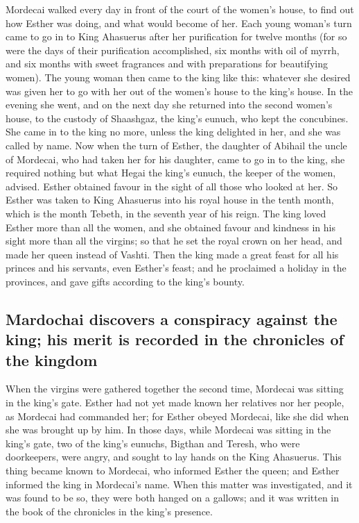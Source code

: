  Mordecai walked every day in front of the court of the
women's house, to find out how Esther was doing, and what would become
of her.  Each young woman's turn came to go in to King
Ahasuerus after her purification for twelve months (for so were the days
of their purification accomplished, six months with oil of myrrh, and
six months with sweet fragrances and with preparations for beautifying
women).  The young woman then came to the king like this:
whatever she desired was given her to go with her out of the women's
house to the king's house.  In the evening she went, and
on the next day she returned into the second women's house, to the
custody of Shaashgaz, the king's eunuch, who kept the concubines. She
came in to the king no more, unless the king delighted in her, and she
was called by name.  Now when the turn of Esther, the
daughter of Abihail the uncle of Mordecai, who had taken her for his
daughter, came to go in to the king, she required nothing but what Hegai
the king's eunuch, the keeper of the women, advised. Esther obtained
favour in the sight of all those who looked at her.  So
Esther was taken to King Ahasuerus into his royal house in the tenth
month, which is the month Tebeth, in the seventh year of his reign.
 The king loved Esther more than all the women, and she
obtained favour and kindness in his sight more than all the virgins; so
that he set the royal crown on her head, and made her queen instead of
Vashti.  Then the king made a great feast for all his
princes and his servants, even Esther's feast; and he proclaimed a
holiday in the provinces, and gave gifts according to the king's bounty.

\hypertarget{mardochai-discovers-a-conspiracy-against-the-king-his-merit-is-recorded-in-the-chronicles-of-the-kingdom}{%
\subsection{Mardochai discovers a conspiracy against the king; his merit
is recorded in the chronicles of the
kingdom}\label{mardochai-discovers-a-conspiracy-against-the-king-his-merit-is-recorded-in-the-chronicles-of-the-kingdom}}

 When the virgins were gathered together the second time,
Mordecai was sitting in the king's gate.  Esther had not
yet made known her relatives nor her people, as Mordecai had commanded
her; for Esther obeyed Mordecai, like she did when she was brought up by
him.  In those days, while Mordecai was sitting in the
king's gate, two of the king's eunuchs, Bigthan and Teresh, who were
doorkeepers, were angry, and sought to lay hands on the King Ahasuerus.
 This thing became known to Mordecai, who informed Esther
the queen; and Esther informed the king in Mordecai's name.
 When this matter was investigated, and it was found to
be so, they were both hanged on a gallows; and it was written in the
book of the chronicles in the king's presence.

